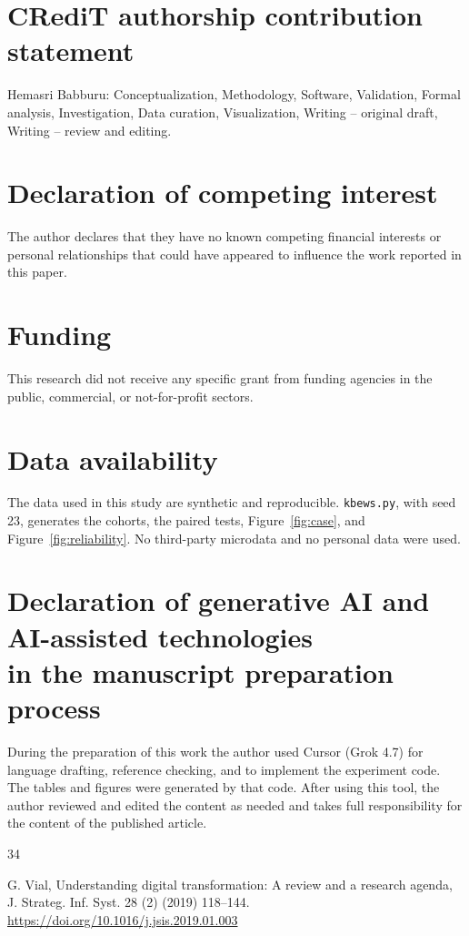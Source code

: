 \documentclass[preprint,12pt]{elsarticle}
\begin{document}
{\singlespacing
\section*{CRediT authorship contribution statement}
Hemasri Babburu: Conceptualization, Methodology, Software, Validation, Formal analysis, Investigation, Data curation, Visualization, Writing -- original draft, Writing -- review and editing.

\section*{Declaration of competing interest}
The author declares that they have no known competing financial interests or personal relationships that could have appeared to influence the work reported in this paper.

\section*{Funding}
This research did not receive any specific grant from funding agencies in the public, commercial, or not-for-profit sectors.

\section*{Data availability}
The data used in this study are synthetic and reproducible. \texttt{kbews.py}, with seed 23, generates the cohorts, the paired tests, Figure~\ref{fig:case}, and Figure~\ref{fig:reliability}. No third-party microdata and no personal data were used.

\section*{Declaration of generative AI and AI-assisted technologies\\ in the manuscript preparation process}
During the preparation of this work the author used Cursor (Grok 4.7) for language drafting, reference checking, and to implement the experiment code. The tables and figures were generated by that code. After using this tool, the author reviewed and edited the content as needed and takes full responsibility for the content of the published article.

\small
\begin{thebibliography}{34}

G. Vial, Understanding digital transformation: A review and a research agenda, J. Strateg. Inf. Syst. 28 (2) (2019) 118--144. \newline\url{https://doi.org/10.1016/j.jsis.2019.01.003}


\end{thebibliography}}
\end{document}
